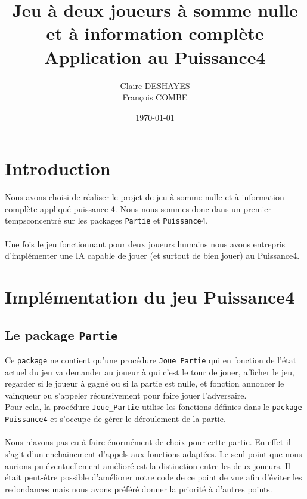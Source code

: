 \documentclass[a4paper,11pt]{article}
\begin{document}
\title {Jeu à deux joueurs à somme nulle et à information complète \\
Application au Puissance4}

\author{Claire DESHAYES \\ François COMBE}
\date{\today}
\maketitle

\section*{Introduction}

Nous avons choisi de réaliser le projet de jeu à somme nulle
et à information complète appliqué puissance 4. Nous nous sommes
donc dans un premier tempsconcentré sur les packages {\tt Partie}
et {\tt Puissance4}. \\ \\
Une fois le jeu fonctionnant pour deux joueurs humains nous avons
entrepris d'implémenter une IA capable de jouer (et surtout de bien
jouer) au Puissance4.

\section{Implémentation du jeu Puissance4}

\subsection{Le package {\tt Partie}}

Ce {\tt package} ne contient qu'une procédure {\tt Joue\_Partie} qui en
fonction de l'état actuel du jeu va demander au joueur à qui c'est le
tour de jouer, afficher le jeu, regarder si le joueur à gagné ou si la partie
est nulle, et fonction annoncer le vainqueur ou s'appeler récursivement pour
faire jouer l'adversaire. \\
Pour cela, la procédure {\tt Joue\_Partie} utilise les fonctions définies dans
le {\tt package Puissance4} et s'occupe de gérer le déroulement de la partie.\\
\\
Nous n'avons pas eu à faire énormément de choix pour cette partie. En
effet il s'agit d'un enchainement d'appels aux fonctions adaptées.
Le seul point que nous aurions pu éventuellement amélioré est la distinction
entre les deux joueurs. Il était peut-être possible d'améliorer notre code
de ce point de vue afin d'éviter les redondances mais nous avons préféré
donner la priorité à d'autres points.
\end{document}
